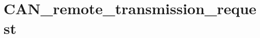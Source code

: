 \hypertarget{group___c_a_n__remote__transmission__request}{\section{C\-A\-N\-\_\-remote\-\_\-transmission\-\_\-request}
\label{group___c_a_n__remote__transmission__request}
}
